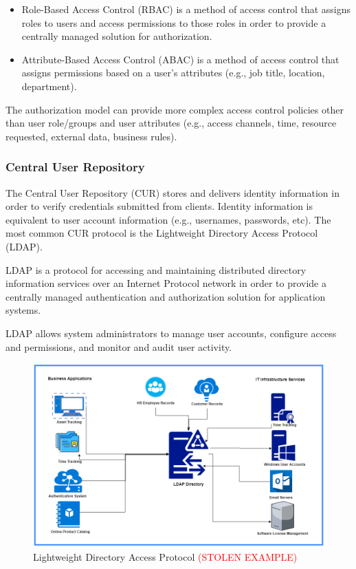 \begin{itemize}
    \item Role-Based Access Control (RBAC) is a method of access control that assigns roles to users  and access permissions to those roles in order to provide a centrally managed solution for authorization. 
    \item Attribute-Based Access Control (ABAC) is a method of access control that assigns permissions based on a user's attributes (e.g., job title, location, department). 
\end{itemize}

The authorization model can provide more complex access control policies other than user role/groups and user attributes (e.g., access channels, time, resource requested, external data, business rules). 

\subsubsection{Central User Repository}
The Central User Repository (CUR) stores and delivers identity information in order to verify credentials submitted from clients. Identity information is equivalent to user account information (e.g., usernames, passwords, etc). The most common CUR protocol is the Lightweight Directory Access Protocol (LDAP). 

LDAP is a protocol for accessing and maintaining distributed directory information services over an Internet Protocol network in order to provide a centrally managed authentication and authorization solution for application systems. 

LDAP allows system administrators to manage user accounts, configure access and permissions, and monitor and audit user activity.

\begin{figure}[H]
    \centering
    \includegraphics[scale = 0.6]{images/LDAP.png}
    \caption{Lightweight Directory Access Protocol \textcolor{red}{(STOLEN EXAMPLE)} }
    \label{LDAP}
\end{figure}


